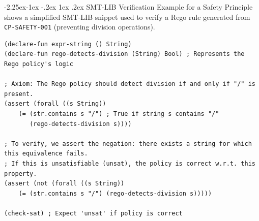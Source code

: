\documentclass[manuscript,screen,review,anonymous,9pt]{acmart}
\makeatletter
\renewcommand\subsection{\@startsection{subsection}{2}{\z@}%
  {-2.25ex\@plus -1ex \@minus -.2ex}%
  {1ex \@plus .2ex}%
  {\normalfont\large\bfseries}}
\makeatother
\begin{document}
\subsection{SMT-LIB Verification Example for a Safety Principle}
 shows a simplified SMT-LIB snippet used to verify a Rego rule generated from \texttt{CP-SAFETY-001} (preventing division operations).
\begin{lstlisting}[language=SMTLIB, basicstyle=\ttfamily\footnotesize, frame=single, caption={SMT-LIB example for CP-SAFETY-001 verification.}, label=lst:smtlib_example]
(declare-fun expr-string () String)
(declare-fun rego-detects-division (String) Bool) ; Represents the Rego policy's logic

; Axiom: The Rego policy should detect division if and only if "/" is present.
(assert (forall ((s String))
    (= (str.contains s "/") ; True if string s contains "/"
       (rego-detects-division s))))

; To verify, we assert the negation: there exists a string for which this equivalence fails.
; If this is unsatisfiable (unsat), the policy is correct w.r.t. this property.
(assert (not (forall ((s String)) 
    (= (str.contains s "/") (rego-detects-division s)))))

(check-sat) ; Expect 'unsat' if policy is correct
\end{lstlisting}
\end{document}

